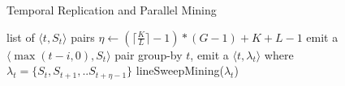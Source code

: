 \begin{algorithm}
\caption{Temporal Replication and Parallel Mining}
\label{algo:trm_overview}
\begin{algorithmic}[1]
\Require list of $\langle t, S_t \rangle$ pairs
\State $\eta \gets (\lceil \frac{K}{L} \rceil -1)*(G-1)+K+L-1$
\label{code:trm-map-start}
		\State emit a $\langle \max(t-i,0), S_t \rangle$ pair
	\EndFor  
\EndFor
\label{code:trm-map-end}
\label{code:trm-par-start}
\State group-by $t$, emit a $\langle t, \lambda_t\rangle$
\State where $\lambda_t = \{S_t, S_{t+1}, .. S_{t+\eta-1}\} $
\EndFor
\label{code:trm-par-end}
\label{code:trm-red-start}
\State lineSweepMining($\lambda_t$)
\label{code:trm-red-end}
\EndFor
\end{algorithmic}
\end{algorithm}
